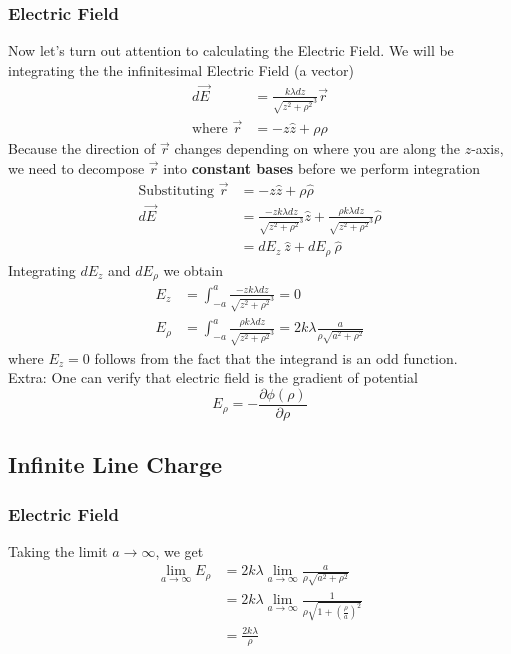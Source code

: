 \documentclass{article}
\begin{document}
\subsubsection{Electric Field}
Now let's turn out attention to calculating the Electric Field. We will be integrating the the infinitesimal Electric Field (a vector)
\begin{align}
    d\vec{E} &= \frac{k \lambda d z}{{\sqrt{z^2+\rho^2}}^3} \vec{r} \\
    \text{where }\vec{r} &= -z \hat{z} + \rho \hat{\rho} 
\end{align}
Because the direction of $\vec{r}$ changes depending on where you are along the $z$-axis, we need to decompose $\vec{r}$ into \textbf{constant bases} before we perform integration
\begin{align}
\text{Substituting } \vec{r} &= -z \hat{z} + \rho \hat{\rho} \\
    d\vec{E} &= \frac{-z k \lambda d z}{{\sqrt{z^2+\rho^2}}^3} \hat{z}+\frac{\rho k \lambda d z}{{\sqrt{z^2+\rho^2}}^3} \hat{\rho} \\ 
    &= dE_z\ \hat{z} + dE_{\rho}\ \hat{\rho} 
\end{align}
Integrating $dE_z$ and $dE_\rho$ we obtain
\begin{align}
    E_z &= \int_{-a}^{a} \frac{-z k \lambda d z}{{\sqrt{z^2+\rho^2}}^3} = 0 \\
    E_\rho &= \int_{-a}^{a} \frac{\rho k \lambda d z}{{\sqrt{z^2+\rho^2}}^3} = 2k\lambda \frac{  a}{\rho \sqrt{a^2 + \rho^2}}
\end{align}
where $E_z=0$ follows from the fact that the integrand is an odd function.\\[10pt]
Extra: One can verify that electric field is the gradient of potential $$E_\rho = -\frac{\partial \phi(\rho)}{\partial \rho}$$

\subsection{Infinite Line Charge}
\subsubsection{Electric Field}
Taking the limit $a\rightarrow\infty$, we get
\begin{align}
    \lim_{a\rightarrow\infty} E_\rho&= 2 k \lambda\lim_{a\rightarrow\infty} \frac{a}{\rho \sqrt{a^2+\rho^2}} \\
    &=  2 k \lambda\lim_{a\rightarrow\infty} \frac{1}{\rho \sqrt{1+\left(\frac{\rho}{a}\right)^2}}\\
    &= \frac{2k\lambda}{\rho}
\end{align}
\end{document}
